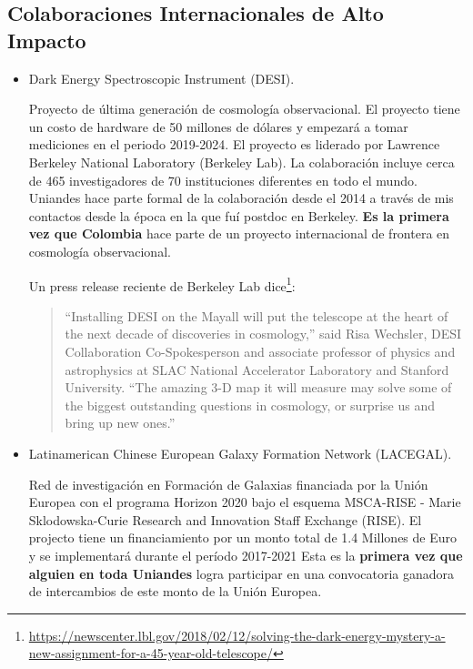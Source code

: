\documentclass{article}
\begin{document}
\subsection{Colaboraciones Internacionales de Alto Impacto}

\begin{itemize}

\item Dark Energy Spectroscopic Instrument (DESI).

Proyecto de \'ultima generaci\'on de cosmolog\'ia observacional.
El proyecto tiene un costo de hardware de 50 millones de d\'olares y
empezar\'a a tomar mediciones en el periodo 2019-2024.
El proyecto es liderado por Lawrence Berkeley National Laboratory
(Berkeley Lab). 
La colaboraci\'on incluye cerca de 465 investigadores de 70
instituciones diferentes en todo el mundo.
Uniandes hace parte formal de la colaboraci\'on desde el 2014 a
trav\'es de mis contactos desde la \'epoca en la que fu\'i postdoc en
Berkeley. 
{\bf Es la primera vez que Colombia} hace parte de un proyecto internacional
de frontera en cosmolog\'ia observacional.


Un press release reciente de Berkeley Lab
dice\footnote{\url{https://newscenter.lbl.gov/2018/02/12/solving-the-dark-energy-mystery-a-new-assignment-for-a-45-year-old-telescope/}}: 
\begin{quote}
“Installing DESI on the Mayall will put the telescope at the heart of
  the next decade of discoveries in cosmology,” said Risa Wechsler,
  DESI Collaboration Co-Spokesperson and associate professor of
  physics and astrophysics at SLAC National Accelerator Laboratory and
  Stanford University. “The amazing 3-D map it will measure may solve
  some of the biggest outstanding questions in cosmology, or surprise
  us and bring up new ones.” 
\end{quote}


\item Latinamerican Chinese European Galaxy Formation Network
  (LACEGAL). 

Red de investigaci\'on en Formaci\'on de Galaxias financiada por la
Uni\'on Europea con el programa Horizon 2020 bajo el esquema MSCA-RISE - Marie
Sklodowska-Curie Research and Innovation Staff Exchange (RISE). El
projecto tiene un financiamiento por un monto total de 1.4 Millones de
Euro y se implementar\'a durante el per\'iodo 2017-2021 
Esta es la {\bf primera vez que alguien en toda Uniandes} logra
participar en una convocatoria ganadora de intercambios de este monto
de la Uni\'on Europea.


\end{itemize}
\end{document}

